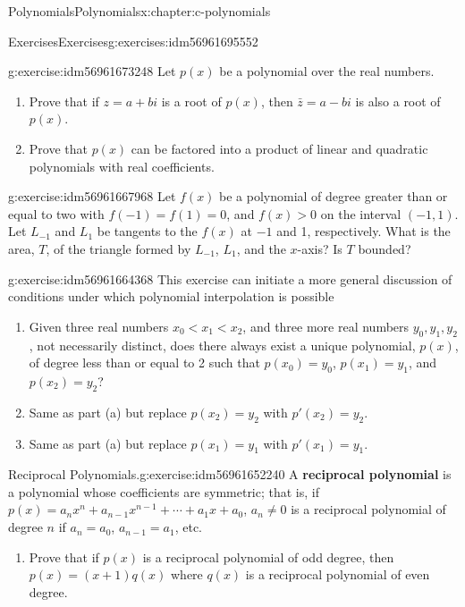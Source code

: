 \documentclass[twoside,10pt,]{book}
\newcommand{\terminology}[1]{\textbf{#1}}
\numberwithin{equation}{section}
\newcommand{\lt}{<}
\begin{document}
\begin{chapterptx}{Polynomials}{}{Polynomials}{}{}{x:chapter:c-polynomials}
\begin{exercises-section}{Exercises}{}{Exercises}{}{}{g:exercises:idm56961695552}
\begin{divisionexercise}{4}{}{}{g:exercise:idm56961673248}
Let \(p(x)\) be a polynomial over the real numbers.%
\begin{enumerate}[label=(\alph*)]
\item{}Prove that if \(z=a + b i\) is a root of \(p(x)\), then \(\bar{z}= a -b i\) is also a root of \(p(x)\).%
\item{}Prove that \(p(x)\) can be factored into a product of linear and quadratic polynomials with real coefficients.%
\end{enumerate}
%
\end{divisionexercise}%
\begin{divisionexercise}{5}{}{}{g:exercise:idm56961667968}%
Let \(f(x)\) be a polynomial of degree greater than or equal to two with \(f(-1)=f(1)=0\), and \(f(x)>0\) on the interval \((-1,1)\).  Let \(L_{-1}\) and \(L_1\) be tangents to the \(f(x)\) at \(-1\) and 1, respectively. What is the area, \(T\), of the triangle formed by \(L_{-1}\), \(L_1\), and the \(x\)-axis?  Is \(T\) bounded?%
\end{divisionexercise}%
\begin{divisionexercise}{6}{}{}{g:exercise:idm56961664368}%
This exercise can initiate a more general discussion of conditions under which polynomial interpolation is possible%
\begin{enumerate}[label=(\alph*)]
\item{}Given three real numbers \(x_0 \lt x_1 \lt x_2\), and three more real numbers \(y_0, y_1, y_2\), not necessarily distinct, does there always exist a unique polynomial, \(p(x)\), of degree less than or equal to 2 such that \(p\left(x_0\right)=y_0\), \(p\left(x_1\right)=y_1\), and \(p\left(x_2\right)=y_2\)?%
\item{}Same as part (a) but replace \(p\left(x_2\right)=y_2\) with \(p'\left(x_2\right)=y_2\).%
\item{}Same as part (a) but replace \(p\left(x_1\right)=y_1\) with \(p'\left(x_1\right)=y_1\).%
\end{enumerate}
%
\end{divisionexercise}%
\begin{divisionexercise}{7}{Reciprocal Polynomials.}{}{g:exercise:idm56961652240}%
%
A \terminology{reciprocal polynomial} is a polynomial whose coefficients are symmetric; that is, if \(p(x) = a_n x^n + a_{n-1}x^{n-1}+ \cdots +a_1 x + a_0\), \(a_n \neq 0\) is a reciprocal polynomial of degree \(n\) if \(a_n = a_0\), \(a_{n-1} = a_1\), etc.%
\begin{enumerate}[label=(\alph*)]
\item{}Prove that if \(p(x)\) is a reciprocal polynomial of odd degree, then \(p(x) = (x+1)q(x)\) where \(q(x) \) is a reciprocal polynomial of even degree.%

\end{enumerate}
\end{divisionexercise}
\end{exercises-section}
\end{chapterptx}
\end{document}
